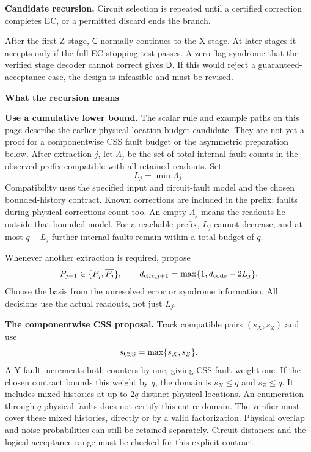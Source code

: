 \documentclass[11pt,a4paper]{article}
\newcommand{\dual}[1]{\ensuremath{\overline{#1}}}
\begin{document}
\begin{center}
{\small\textbf{Candidate recursion.} Circuit selection is repeated until a
certified correction completes EC, or a permitted discard ends the branch.}
\end{center}

After the first Z stage, $\mathsf C$ normally continues to the X stage.
At later stages it accepts only if the full EC stopping test passes.
A zero-flag syndrome that the verified stage decoder cannot correct gives
$\mathsf D$. If this would reject a guaranteed-acceptance case, the design
is infeasible and must be revised.

\clearpage
{\LARGE\bfseries What the recursion means}\par

\textbf{Use a cumulative lower bound.}
The scalar rule and example paths on this page describe the earlier
physical-location-budget candidate. They are not yet a proof for a
componentwise CSS fault budget or the asymmetric preparation below.
After extraction $j$, let $\Lambda_j$ be the set of total internal fault
counts in the observed prefix compatible with all retained readouts. Set
\[
 L_j=\min\Lambda_j.
\]
Compatibility uses the specified input and circuit-fault model and the
chosen bounded-history contract. Known corrections are included in the
prefix; faults during physical corrections count too.
An empty $\Lambda_j$ means the readouts lie outside that bounded model.
For a reachable prefix, $L_j$ cannot decrease, and at most $q-L_j$ further
internal faults remain within a total budget of $q$.

Whenever another extraction is required, propose
\[
 P_{j+1}\in\{P_j,\dual{P_j}\},\qquad
 d_{{\rm circ},j+1}=\max\{1,d_{\rm code}-2L_j\}.
\]
Choose the basis from the unresolved error or syndrome information.
All decisions use the actual readouts, not just $L_j$.

\textbf{The componentwise CSS proposal.}
Track compatible pairs $(s_X,s_Z)$ and use
\[
 s_{\rm CSS}=\max\{s_X,s_Z\}.
\]
A Y fault increments both counters by one, giving CSS fault weight one.
If the chosen contract bounds this weight by $q$, the domain is
$s_X\leq q$ and $s_Z\leq q$. It includes mixed histories at up to $2q$
distinct physical locations. An enumeration through $q$ physical faults
does not certify this entire domain. The verifier must cover these mixed
histories, directly or by a valid factorization. Physical overlap and noise
probabilities can still be retained separately. Circuit distances and the
logical-acceptance range must be checked for this explicit contract.
\end{document}
